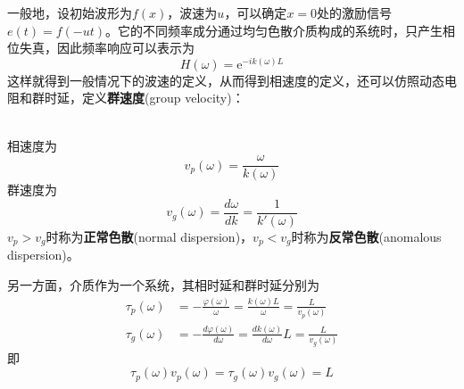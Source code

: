 一般地，设初始波形为$f(x)$，波速为$u$，可以确定$x=0$处的激励信号$e(t)=f(-ut)$。它的不同频率成分通过均匀色散介质构成的系统时，只产生相位失真，因此频率响应可以表示为
\[H(\omega)=\mathrm{e}^{-ik(\omega)L}\]
这样就得到一般情况下的波速的定义，从而得到相速度的定义，还可以仿照动态电阻和群时延，定义\textbf{群速度}(group velocity)：
\begin{definition}[相速度和群速度]
    \quad\\
    相速度为\[v_p(\omega)=\frac{\omega}{k(\omega)}\]
    群速度为\[v_g(\omega)=\frac{d\omega}{dk}=\frac{1}{k'(\omega)}\]
    $v_p>v_g$时称为\textbf{正常色散}(normal dispersion)，$v_p<v_g$时称为\textbf{反常色散}(anomalous dispersion)。
\end{definition}
另一方面，介质作为一个系统，其相时延和群时延分别为
\begin{align*}
    \tau_p(\omega)&=-\frac{\varphi(\omega)}{\omega}=\frac{k(\omega)L}{\omega}=\frac{L}{v_p(\omega)}\\
    \tau_g(\omega)&=-\frac{d\varphi(\omega)}{d\omega}=\frac{dk(\omega)}{d\omega}L=\frac{L}{v_g(\omega)}
\end{align*}
即\[\tau_p(\omega)v_p(\omega)=\tau_g(\omega)v_g(\omega)=L\]

